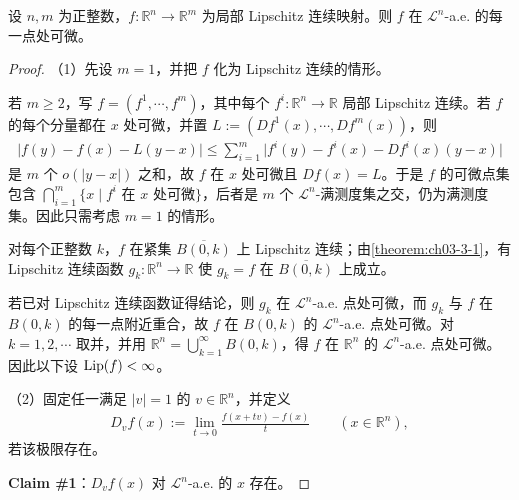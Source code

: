 \documentclass[../../main.tex]{subfiles}%
\begin{document}
\begin{theorem}[Rademacher 定理]\label{theorem:ch03-3-2}
设 $n,m$ 为正整数，$f:\mathbb{R}^n\to\mathbb{R}^m$ 为局部 Lipschitz 连续映射。则 $f$ 在 $\mathcal{L}^n$-a.e. 的每一点处可微。
\end{theorem}

\begin{proof}
（1）先设 $m=1$，并把 $f$ 化为 Lipschitz 连续的情形。

若 $m\geqslant2$，写 $f=(f^1,\cdots,f^m)$，其中每个 $f^i:\mathbb{R}^n\to\mathbb{R}$ 局部 Lipschitz 连续。若 $f$ 的每个分量都在 $x$ 处可微，并置 $L:=(Df^1(x),\cdots,Df^m(x))$，则
\begin{align*}
\lvert f(y)-f(x)-L(y-x)\rvert\leqslant\sum_{i=1}^m\bigl\lvert f^i(y)-f^i(x)-Df^i(x)(y-x)\bigr\rvert
\end{align*}
是 $m$ 个 $o(\lvert y-x\rvert)$ 之和，故 $f$ 在 $x$ 处可微且 $Df(x)=L$。于是 $f$ 的可微点集包含 $\bigcap_{i=1}^m\{x\mid f^i\text{ 在 }x\text{ 处可微}\}$，后者是 $m$ 个 $\mathcal{L}^n$-满测度集之交，仍为满测度集。因此只需考虑 $m=1$ 的情形。

对每个正整数 $k$，$f$ 在紧集 $\overline{B(0,k)}$ 上 Lipschitz 连续；由\cref{theorem:ch03-3-1}，有 Lipschitz 连续函数 $g_k:\mathbb{R}^n\to\mathbb{R}$ 使 $g_k=f$ 在 $\overline{B(0,k)}$ 上成立。%

若已对 Lipschitz 连续函数证得结论，则 $g_k$ 在 $\mathcal{L}^n$-a.e. 点处可微，而 $g_k$ 与 $f$ 在 $B(0,k)$ 的每一点附近重合，故 $f$ 在 $B(0,k)$ 的 $\mathcal{L}^n$-a.e. 点处可微。对 $k=1,2,\cdots$ 取并，并用 $\mathbb{R}^n=\bigcup_{k=1}^{\infty}B(0,k)$，得 $f$ 在 $\mathbb{R}^n$ 的 $\mathcal{L}^n$-a.e. 点处可微。因此以下设 $\operatorname{Lip}(f)<\infty$。

（2）固定任一满足 $\lvert v\rvert=1$ 的 $v\in\mathbb{R}^n$，并定义
\begin{align*}
D_vf(x):=\lim_{t\to0}\frac{f(x+tv)-f(x)}{t}\qquad(x\in\mathbb{R}^n),
\end{align*}
若该极限存在。

\textbf{Claim \#1}：$D_vf(x)$ 对 $\mathcal{L}^n$-a.e. 的 $x$ 存在。


\end{proof}
\end{document}
